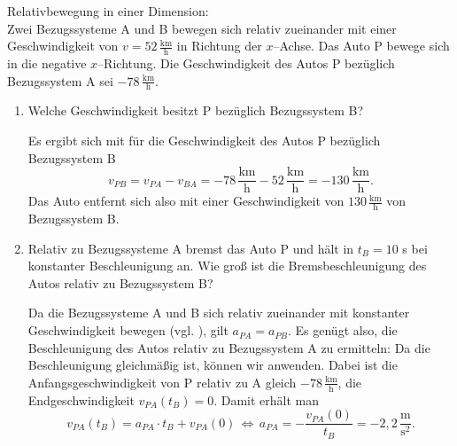       \begin{MExercises}

      \begin{MExercise} Relativbewegung in einer Dimension:\\
      Zwei Bezugssysteme A und B bewegen sich relativ zueinander mit einer Geschwindigkeit von $v=52  \,\frac{\text{km}}{\text{h}}$ in Richtung der $x$--Achse. Das Auto P bewege sich in die negative $x$--Richtung. Die Geschwindigkeit des Autos P bez\"uglich Bezugssystem A sei $-78  \,\frac{\text{km}}{\text{h}}$. 
      \begin{enumerate}
      \item Welche Geschwindigkeit besitzt P bez\"uglich Bezugssystem B? 
      
      \begin{MSolution} Es ergibt sich mit  f\"ur die Geschwindigkeit des Autos P bez\"uglich Bezugssystem B 
      \begin{equation*}{v}_{PB}={v}_{PA}-{v}_{BA}=-78  \,\frac{\text{km}}{\text{h}}-52  \,\frac{\text{km}}{\text{h}}=-130 \,\frac{\text{km}}{\text{h}}.
      \end{equation*}
      Das Auto entfernt sich also mit einer Geschwindigkeit von $ 130\, \frac{\text{km}}{\text{h}}$ von Bezugssystem B.
      \end{MSolution}
      \item Relativ zu Bezugssysteme A bremst das Auto P und h\"alt in $t_B=10$ s bei konstanter Beschleunigung an. Wie gro{\ss} ist die Bremsbeschleunigung des Autos relativ zu Bezugssystem B?
      
      \begin{MSolution} Da die Bezugssysteme A und B sich relativ zueinander mit konstanter Geschwindigkeit bewegen (vgl. ), gilt $a_{PA}=a_{PB}$. Es gen\"ugt also, die Beschleunigung des Autos relativ zu Bezugssystem A zu ermitteln: Da die Beschleunigung gleichm\"a{\ss}ig ist, k\"onnen wir  anwenden. Dabei ist die Anfangsgeschwindigkeit von P relativ zu A gleich $-78 \, \frac{\text{km}}{\text{h}}$, die Endgeschwindigkeit ${v}_{PA}(t_B)=0$. Damit erh\"alt man
      \begin{equation*}
      {v}_{PA}(t_B)=a_{PA}\cdot t_B+{v}_{PA}(0)\,\Leftrightarrow\, a_{PA}= -\frac{{v}_{PA}(0)}{t_B}=- {2,2}\,\frac{\text{m}}{\text{s}^2}.
      \end{equation*}
      

\end{MSolution}
\end{enumerate}
\end{MExercise}
\end{MExercises}
